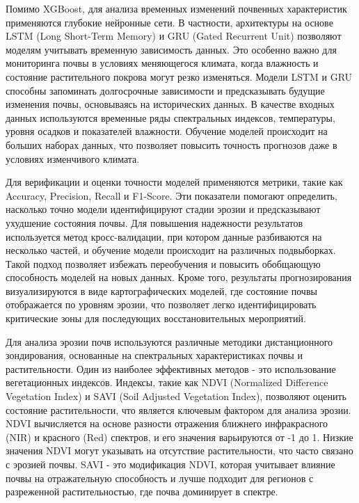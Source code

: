 \begin{multicols}{2}
Помимо XGBoost, для анализа временных изменений почвенных характеристик
применяются глубокие нейронные сети. В частности, архитектуры на основе
LSTM (Long Short-Term Memory) и GRU (Gated Recurrent Unit) позволяют
моделям учитывать временную зависимость данных. Это особенно важно для
мониторинга почвы в условиях меняющегося климата, когда влажность и
состояние растительного покрова могут резко изменяться. Модели LSTM и
GRU способны запоминать долгосрочные зависимости и предсказывать будущие
изменения почвы, основываясь на исторических данных. В качестве входных
данных используются временные ряды спектральных индексов, температуры,
уровня осадков и показателей влажности. Обучение моделей происходит на
больших наборах данных, что позволяет повысить точность прогнозов даже в
условиях изменчивого климата.

Для верификации и оценки точности моделей применяются метрики, такие как
Accuracy, Precision, Recall и F1-Score. Эти показатели помогают
определить, насколько точно модели идентифицируют стадии эрозии и
предсказывают ухудшение состояния почвы. Для повышения надежности
результатов используется метод кросс-валидации, при котором данные
разбиваются на несколько частей, и обучение модели происходит на
различных подвыборках. Такой подход позволяет избежать переобучения и
повысить обобщающую способность моделей на новых данных. Кроме того,
результаты прогнозирования визуализируются в виде картографических
моделей, где состояние почвы отображается по уровням эрозии, что
позволяет легко идентифицировать критические зоны для последующих
восстановительных мероприятий.

Для анализа эрозии почв используются различные методики дистанционного
зондирования, основанные на спектральных характеристиках почвы и
растительности. Один из наиболее эффективных методов - это использование
вегетационных индексов. Индексы, такие как NDVI (Normalized Difference
Vegetation Index) и SAVI (Soil Adjusted Vegetation Index), позволяют
оценить состояние растительности, что является ключевым фактором для
анализа эрозии. NDVI вычисляется на основе разности отражения ближнего
инфракрасного (NIR) и красного (Red) спектров, и его значения
варьируются от -1 до 1. Низкие значения NDVI могут указывать на
отсутствие растительности, что часто связано с эрозией почвы. SAVI - это
модификация NDVI, которая учитывает влияние почвы на отражательную
способность и лучше подходит для регионов с разреженной растительностью,
где почва доминирует в спектре.


\end{multicols}
